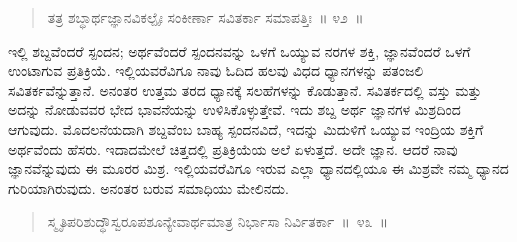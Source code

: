 \vspace{-0.3cm}

\begin{verse}
ತತ್ರ ಶಬ್ಧಾರ್ಥಜ್ಞಾನವಿಕಲ್ಪೈಃ ಸಂಕೀರ್ಣಾ ಸವಿತರ್ಕಾ ಸಮಾಪತ್ತಿಃ~॥ ೪೨~॥
\end{verse}

\vspace{-0.4cm}


\vspace{0.1cm}

ಇಲ್ಲಿ ಶಬ್ದವೆಂದರೆ ಸ್ಪಂದನ; ಅರ್ಥವೆಂದರೆ ಸ್ಪಂದನವನ್ನು ಒಳಗೆ ಒಯ್ಯುವ ನರಗಳ ಶಕ್ತಿ, ಜ್ಞಾನವೆಂದರೆ ಒಳಗೆ ಉಂಟಾಗುವ ಪ್ರತಿಕ್ರಿಯೆ. ಇಲ್ಲಿಯವರೆವಿಗೂ ನಾವು ಓದಿದ ಹಲವು ವಿಧದ ಧ್ಯಾನಗಳನ್ನು ಪತಂಜಲಿ ಸವಿತರ್ಕವೆನ್ನುತ್ತಾನೆ. ಅನಂತರ ಉತ್ತಮ ತರದ ಧ್ಯಾನಕ್ಕೆ ಸಲಹೆಗಳನ್ನು ಕೊಡುತ್ತಾನೆ. ಸವಿತರ್ಕದಲ್ಲಿ ವಸ್ತು ಮತ್ತು ಅದನ್ನು ನೋಡುವವರ ಭೇದ ಭಾವನೆಯನ್ನು ಉಳಿಸಿಕೊಳ್ಳುತ್ತೇವೆ. ಇದು ಶಬ್ದ ಅರ್ಥ ಜ್ಞಾನಗಳ ಮಿಶ್ರದಿಂದ ಆಗುವುದು. ಮೊದಲನೆಯದಾಗಿ ಶಬ್ದವೆಂಬ ಬಾಹ್ಯ ಸ್ಪಂದನವಿದೆ, ಇದನ್ನು ಮಿದುಳಿಗೆ ಒಯ್ಯುವ ಇಂದ್ರಿಯ ಶಕ್ತಿಗೆ ಅರ್ಥವೆಂದು ಹೆಸರು. ಇದಾದಮೇಲೆ ಚಿತ್ತದಲ್ಲಿ ಪ್ರತಿಕ್ರಿಯೆಯ ಅಲೆ ಏಳುತ್ತದೆ. ಅದೇ ಜ್ಞಾನ. ಆದರೆ ನಾವು ಜ್ಞಾನವೆನ್ನುವುದು ಈ ಮೂರರ ಮಿಶ್ರ. ಇಲ್ಲಿಯವರೆವಿಗೂ ಇರುವ ಎಲ್ಲಾ ಧ್ಯಾನದಲ್ಲಿಯೂ ಈ ಮಿಶ್ರವೇ ನಮ್ಮ ಧ್ಯಾನದ ಗುರಿಯಾಗಿರುವುದು. ಅನಂತರ ಬರುವ ಸಮಾಧಿಯು ಮೇಲಿನದು. 

\vspace{-0.3cm}

\begin{verse}
ಸ್ಮೃತಿಪರಿಶುದ್ಧೌಸ್ವರೂಪಶೂನ್ಯೇವಾರ್ಥಮಾತ್ರ ನಿರ್ಭಾಸಾ ನಿರ್ವಿತರ್ಕಾ~॥~೪೩~॥
\end{verse}

\vspace{-0.4cm}


\vspace{0.1cm}

